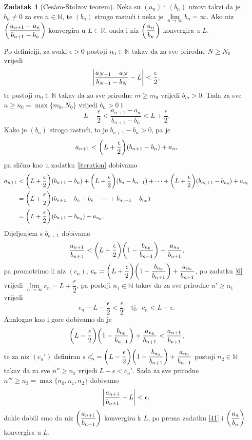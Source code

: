 \documentclass{book}
\let\originalleft\left
\let\originalright\right
\renewcommand{\left}{\mathopen{}\mathclose\bgroup\originalleft}
\renewcommand{\right}{\aftergroup\egroup\originalright}
\renewenvironment{proof}{%
    \vspace{-\parskip}\begin{oldproof}%
    }{%
    \end{oldproof}%
}
\theoremstyle{definition}
\theoremstyle{definition}
\newtheorem{exercise}{Zadatak}
\theoremstyle{remark}
\begin{document}
\begin{exercise}[Cesàro-Stolzov teorem] Neka su $(a_n)$ i $(b_n)$ nizovi takvi da je $b_n\neq 0$ za sve $n\in \mathbb{N}$, te $(b_n)$ strogo rastući i neka je $\lim\limits_{n\to \infty}{b_n}=\infty$. Ako niz $\left(\dfrac{a_{n+1}-a_n}{b_{n+1}-b_n}\right)$ konvergira u $L\in \mathbb{R}$, onda i niz $\left(\dfrac{a_n}{b_n}\right)$ konvergira u $L$.
\end{exercise}
\begin{proof}[Rješenje]
Po definiciji, za svaki $\epsilon>0$ postoji $n_0\in \mathbb{N}$ takav da za sve prirodne $N\geq N_0$ vrijedi
$$\abs{\dfrac{a_{N+1}-a_N}{b_{N+1}-b_N}-L}<\dfrac{\epsilon}{2},$$
te postoji $m_0\in \mathbb{N}$ takav da za sve prirodne $m\geq m_0$ vrijedi $b_m>0$. Tada za sve $n\geq n_0=\max\{m_0, N_0\}$ vrijedi $b_n>0$ i
$$L-\dfrac{\epsilon}{2}<\dfrac{a_{n+1}-a_n}{b_{n+1}-b_n}<L+\dfrac{\epsilon}{2}.$$
Kako je $(b_n)$ strogo rastući, to je $b_{n+1}-b_n>0$, pa je
$$a_{n+1}<\left(L+\dfrac{\epsilon}{2}\right)(b_{n+1}-b_n)+a_n,$$
pa slično kao u zadatku \ref{iteration} dobivamo
\begin{align*}
a_{n+1}&<\left(L+\dfrac{\epsilon}{2}\right)(b_{n+1}-b_n)+\left(L+\dfrac{\epsilon}{2}\right)(b_{n}-b_{n-1})+\dots+ \left(L+\dfrac{\epsilon}{2}\right)(b_{n_0+1}-b_{n_0})+a_{n_0}\\
&=\left(L+\dfrac{\epsilon}{2}\right)(b_{n+1}-b_{n}+b_{n}-\dots+b_{n_0+1}-b_{n_0})\\
&=\left(L+\dfrac{\epsilon}{2}\right)(b_{n+1}-b_{n_0})+a_{n_0}.
\end{align*}
Dijeljenjem s $b_{n+1}$ dobivamo
$$\dfrac{a_{n+1}}{b_{n+1}}<\left(L+\dfrac{\epsilon}{2}\right)\left(1-\dfrac{b_{n_0}}{b_{n+1}}\right)+\dfrac{a_{n_0}}{b_{n+1}},$$
pa promotrimo li niz $(c_n)$, $c_n=\left(L+\dfrac{\epsilon}{2}\right)\left(1-\dfrac{b_{n_0}}{b_{n+1}}\right)+\dfrac{a_{n_0}}{b_{n+1}}$,
po zadatku \ref{6} vrijedi $\lim\limits_{n\to \infty}{c_n}=L+\dfrac{\epsilon}{2}$, pa postoji $n_1\in \mathbb{N}$ takav da za sve prirodne $n'\geq n_1$ vrijedi $$c_{n}-L-\dfrac{\epsilon}{2}<\dfrac{\epsilon}{2},\;\text{ tj. }\; c_n<L+\epsilon.$$
Analogno kao i gore dobivamo da je
$$\left(L-\dfrac{\epsilon}{2}\right)\left(1-\dfrac{b_{n_0}}{b_{n+1}}\right)+\dfrac{a_{n_0}}{b_{n+1}}<\dfrac{a_{n+1}}{b_{n+1}},$$
te za niz $(c_n')$ definiran s $c_n'=\left(L-\dfrac{\epsilon}{2}\right)\left(1-\dfrac{b_{n_0}}{b_{n+1}}\right)+\dfrac{a_{n_0}}{b_{n+1}}$ postoji $n_2\in \mathbb{N}$ takav da za sve $n''\geq n_2$ vrijedi $L-\epsilon<c_n'$. Sada za sve prirodne $n'''\geq n_3=\max\{n_0, n_1, n_2\}$ dobivamo
$$\abs{\dfrac{a_{n+1}}{b_{n+1}}-L}<\epsilon,$$
dakle dobili smo da niz $\left(\dfrac{a_{n+1}}{b_{n+1}}\right)$ konvergira k $L$, pa prema zadatku \ref{41} i $\left(\dfrac{a_{n}}{b_{n}}\right)$ konvergira u $L$.
\end{proof}
\end{document}

